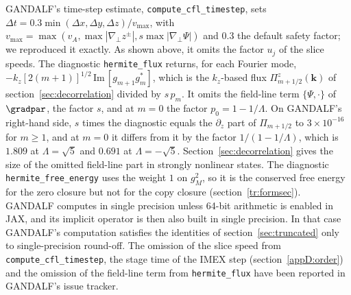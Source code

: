 GANDALF's time-step estimate, \texttt{compute\_cfl\_timestep}, sets $\Delta t=0.3\min(\Delta x,\Delta y,\Delta z)/v_{\max}$, with $v_{\max}=\max(v_A,\max|\nabla_\perp z^\pm|,s\max|\nabla_\perp\Psi|)$ and $0.3$ the default safety factor; we reproduced it exactly. As shown above, it omits the factor $u_j$ of the slice speeds. The diagnostic \texttt{hermite\_flux} returns, for each Fourier mode, $-k_z[2(m+1)]^{1/2}\,\mathrm{Im}\,[g_{m+1}g_m^*]$, which is the $k_z$-based flux $\Pi^z_{m+1/2}(\boldsymbol k)$ of section~\ref{sec:decorrelation} divided by $s\,p_m$. It omits the field-line term $\{\Psi,\cdot\}$ of $\gradpar$, the factor $s$, and at $m=0$ the factor $p_0=1-1/\Lambda$. On GANDALF's right-hand side, $s$ times the diagnostic equals the $\partial_z$ part of $\Pi_{m+1/2}$ to $3\times10^{-16}$ for $m\ge1$, and at $m=0$ it differs from it by the factor $1/(1-1/\Lambda)$, which is $1.809$ at $\Lambda=\sqrt5$ and $0.691$ at $\Lambda=-\sqrt5$. Section~\ref{sec:decorrelation} gives the size of the omitted field-line part in strongly nonlinear states. The diagnostic \texttt{hermite\_free\_energy} uses the weight $1$ on $g_M^2$, so it is the conserved free energy for the zero closure but not for the copy closure (section~\ref{tr:formsec}). GANDALF computes in single precision unless 64-bit arithmetic is enabled in JAX, and its implicit operator is then also built in single precision. In that case GANDALF's computation satisfies the identities of section~\ref{sec:truncated} only to single-precision round-off. The omission of the slice speed from \texttt{compute\_cfl\_timestep}, the stage time of the IMEX step (section~\ref{appD:order}) and the omission of the field-line term from \texttt{hermite\_flux} have been reported in GANDALF's issue tracker.
